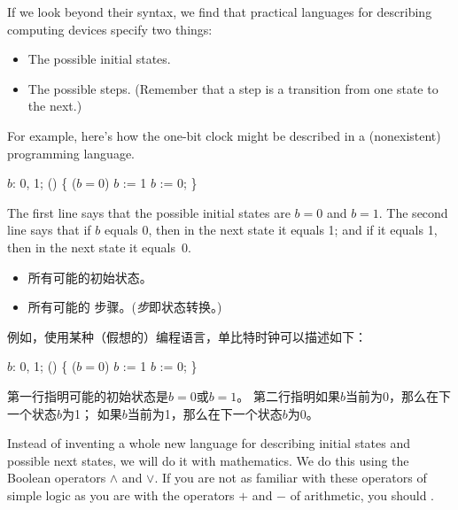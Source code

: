 \begin{en}
If we look beyond their syntax, we find that practical languages for
describing computing devices specify two things:
\begin{itemize}
\item The possible initial states.

\item The possible 
steps.  (Remember that a step is a transition from one state to the
next.)
\end{itemize}
For example, here's how the one-bit clock might be
described in a (nonexistent) programming language.
\begin{program}
 $b$: 0, 1; 
 () \{  ($b=0$) $b$ := 1 
                           $b$ := 0; \} 
\end{program}
The first line says that the possible initial states are $b=0$ and
$b=1$.  The second line says that if $b$ equals 0, then in the next
state it equals 1; and if it equals 1, then in the next state it
equals~0.
\end{en}

\begin{ch}
  \begin{itemize}
    \item 所有可能的初始状态。
    \item 所有可能的%
	步骤。(\emph{步}即状态转换。)
  \end{itemize}
  例如，使用某种（假想的）编程语言，单比特时钟可以描述如下：
  \begin{program}
   $b$: 0, 1; 
   () \{  ($b=0$) $b$ := 1 
			     $b$ := 0; \} 
  \end{program}
  第一行指明可能的初始状态是$b=0$或$b=1$。
  第二行指明如果$b$当前为0，那么在下一个状态$b$为1；
  如果$b$当前为1，那么在下一个状态$b$为0。
\end{ch}

\begin{en}
Instead of inventing a whole new language for describing initial
states and possible next states, we will do it with mathematics.  We
do this using the Boolean operators $\land$ and $\lor$.  If you are
not as familiar with these operators of simple logic as you are with
the operators $+$ and $-$ of arithmetic, you should
\textsf{}.
\end{en}

